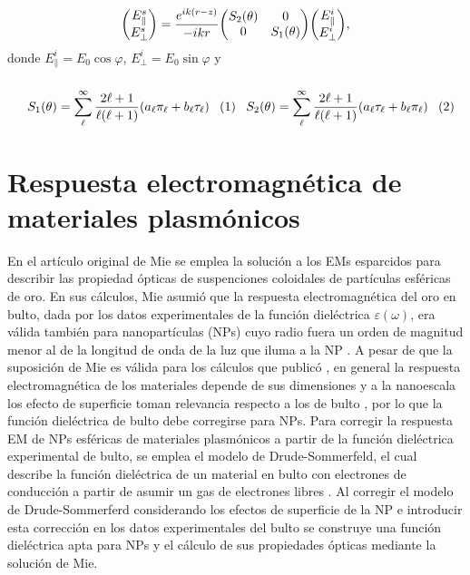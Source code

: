 	\begin{tcolorbox}[title = Matriz de esparcimiento de Mie,  breakable ]
	\begin{align}
	\mqty(E_{\parallel}^s\\E_{\perp}^s)  =  
		\frac{e^{ik(r-z)}}{-ikr} \mqty(S_2 (\theta) & 0\\ 0 & S_1 (\theta))
	\mqty(E_{\parallel}^i\\E_{\perp}^i),	
	\label{eq:MieMatrix}
	\end{align}
	donde $E^i_\parallel=E_0\cos\varphi$, $E^i_\perp = E_0\sin\varphi$ y \begin{subequations}\\
	\eqhalf{	S_1 (\theta) = \sum_\ell^\infty\frac{2\ell+1}{\ell(\ell+1)}(a_\ell\pi_\ell+b_\ell\tau_\ell)
				\label{eqs:S_1}}
	\eqhalf{	S_2 (\theta) = \sum_\ell^\infty\frac{2\ell+1}{\ell(\ell+1)}( a_\ell \tau_\ell + b_\ell\pi_\ell )
			 \label{eqs:S_2}	}
	\label{eq:MatrixElements}	\end{subequations}
	\end{tcolorbox}\vspace*{-.5em}\noindent

\section{Respuesta electromagnética de materiales plasmónicos}

En el artículo original de Mie \cite{mie1908metallosung} se emplea la solución a los EMs esparcidos para describir las propiedad ópticas de suspenciones coloidales de partículas esféricas de oro. En sus cálculos, Mie asumió que la  respuesta electromagnética del oro en bulto, dada por los datos experimentales de la función dieléctrica $\varepsilon(\omega)$, era válida también para nanopartículas (NPs) cuyo radio fuera un orden de magnitud menor al de la longitud de onda de la luz que iluma a la NP \cite{horvath2009historic}. A pesar de que la suposición de Mie es válida para los cálculos que publicó \cite{horvath2009historic}, en general la respuesta electromagnética de los materiales depende de sus dimensiones y a la nanoescala los efecto de superficie toman relevancia respecto a los de bulto \cite{boverhof2015comparative}, por lo que la función dieléctrica de bulto debe corregirse para NPs. Para corregir la respuesta EM de NPs esféricas de materiales plasmónicos a partir de la función dieléctrica experimental de bulto, se emplea el modelo de Drude-Sommerfeld, el cual describe la función dieléctrica de un material en bulto con electrones de conducción a partir de asumir un gas de electrones libres \cite{gross2014festkorperphysik}. Al corregir el modelo de Drude-Sommerferd considerando los efectos de superficie de la NP e introducir esta corrección en los datos experimentales del bulto se construye una función dieléctrica apta para NPs y el cálculo de sus propiedades ópticas mediante la solución de Mie.

